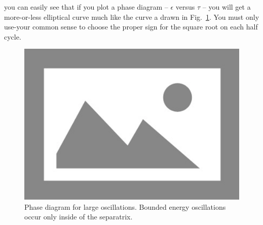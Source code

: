 you can easily see that if you plot a phase diagram -- $\epsilon$ versus $\tau$ -- you will get
a more-or-less elliptical curve much like the curve a drawn in Fig.~\ref{fig:fig37}. You must only use-your common sense to choose the proper sign for the square root on each half cycle.

\begin{figure}[!htb]
	\centering
	\includegraphics[width=0.8\linewidth]{./Figuras/placeholder.png}
	\caption{Phase diagram for large oscillations. Bounded energy oscillations occur only inside of the separatrix.}
	\label{fig:fig37}
\end{figure}

